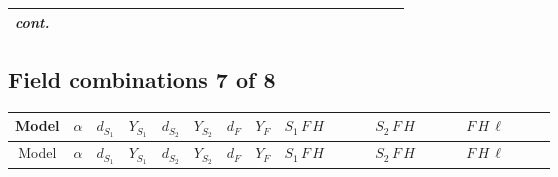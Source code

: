 \documentclass[8pt]{article}
\begin{document}
\begin{landscape}
\begin{longtable}{@{}cccccccc >{\raggedright\arraybackslash}p{0.21\linewidth} >{\raggedright\arraybackslash}p{0.21\linewidth} >{\raggedright\arraybackslash}p{0.21\linewidth}@{}}
\textit{cont.} &  &  &  &  &  &  &  &  &  & \scriptsize\adjustbox{max width=\linewidth}{$\begin{gathered} -\frac{\hbar  \overline{y_{1,i_1,r_1}} \overline{y_{2,i_2,r_1}} L_{a_2,i_2}{}^T\, C\, P_L\, L_{a_1,i_1} S_2 \mathcal{I}_{T3,a_1,a_2,j_1} S_{1,j_1}{}^{\dagger } \lambda_{12}^{(1)}^{(1)}}{M_F}\end{gathered}$} \\
\midrule
\bottomrule
\end{longtable}
\clearpage
\subsection*{Field combinations 7 of 8}
\begin{longtable}{@{}cccccccc >{\raggedright\arraybackslash}p{0.21\linewidth} >{\raggedright\arraybackslash}p{0.21\linewidth} >{\raggedright\arraybackslash}p{0.21\linewidth}@{}}
\toprule
Model & $\alpha$ & $d_{S_1}$ & $Y_{S_1}$ & $d_{S_2}$ & $Y_{S_2}$ & $d_F$ & $Y_F$ & $S_1\,F\,H$ & $S_2\,F\,H$ & $F\,H\,\ell$ \\
\midrule
\endfirsthead
\toprule
Model & $\alpha$ & $d_{S_1}$ & $Y_{S_1}$ & $d_{S_2}$ & $Y_{S_2}$ & $d_F$ & $Y_F$ & $S_1\,F\,H$ & $S_2\,F\,H$ & $F\,H\,\ell$ \\
\midrule
\endhead

\end{longtable}
\end{landscape}
\end{document}
